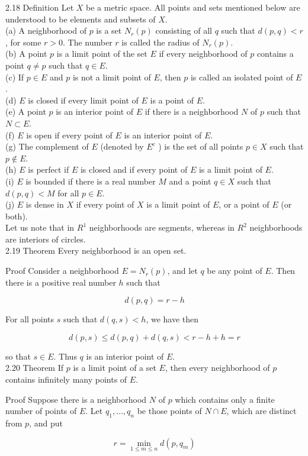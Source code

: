 \documentclass[10pt]{article}
\begin{document}
2.18 Definition Let $X$ be a metric space. All points and sets mentioned below are understood to be elements and subsets of $X$.\\
(a) A neighborhood of $p$ is a set $N_{r}(p)$ consisting of all $q$ such that $d(p, q)<r$, for some $r>0$. The number $r$ is called the radius of $N_{r}(p)$.\\
(b) A point $p$ is a limit point of the set $E$ if every neighborhood of $p$ contains a point $q \neq p$ such that $q \in E$.\\
(c) If $p \in E$ and $p$ is not a limit point of $E$, then $p$ is called an isolated point of $E$.\\
(d) $E$ is closed if every limit point of $E$ is a point of $E$.\\
(e) A point $p$ is an interior point of $E$ if there is a neighborhood $N$ of $p$ such that $N \subset E$.\\
(f) $E$ is open if every point of $E$ is an interior point of $E$.\\
(g) The complement of $E$ (denoted by $E^{c}$ ) is the set of all points $p \in X$ such that $p \notin E$.\\
(h) $E$ is perfect if $E$ is closed and if every point of $E$ is a limit point of $E$.\\
(i) $E$ is bounded if there is a real number $M$ and a point $q \in X$ such that $d(p, q)<M$ for all $p \in E$.\\
(j) $E$ is dense in $X$ if every point of $X$ is a limit point of $E$, or a point of $E$ (or both).\\
Let us note that in $R^{1}$ neighborhoods are segments, whereas in $R^{2}$ neighborhoods are interiors of circles.\\
2.19 Theorem Every neighborhood is an open set.

Proof Consider a neighborhood $E=N_{r}(p)$, and let $q$ be any point of $E$. Then there is a positive real number $h$ such that

$$
d(p, q)=r-h
$$

For all points $s$ such that $d(q, s)<h$, we have then

$$
d(p, s) \leq d(p, q)+d(q, s)<r-h+h=r
$$

so that $s \in E$. Thus $q$ is an interior point of $E$.\\
2.20 Theorem If $p$ is a limit point of a set $E$, then every neighborhood of $p$ contains infinitely many points of $E$.

Proof Suppose there is a neighborhood $N$ of $p$ which contains only a finite number of points of $E$. Let $q_{1}, \ldots, q_{n}$ be those points of $N \cap E$, which are distinct from $p$, and put

$$
r=\min _{1 \leq m \leq n} d\left(p, q_{m}\right)
$$
\end{document}
